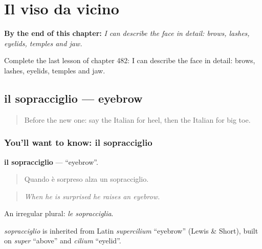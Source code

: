 
\chapter{Il viso da vicino}
\label{ch:it-il-viso-da-vicino}

\begin{chapteropening}
\textbf{By the end of this chapter:} \emph{I can describe the face in detail: brows, lashes, eyelids, temples and jaw.}

Complete the last lesson of chapter 482: I can describe the face in detail: brows, lashes, eyelids, temples and jaw.
\end{chapteropening}

\section[il sopracciglio]{il sopracciglio — eyebrow}

\label{lesson:IT-C482-sopracciglio}



\begin{quote}
Before the new one: say the Italian for heel, then the Italian for big toe.
\end{quote}

\subsection*{You'll want to know: il sopracciglio}
\textbf{il sopracciglio} — \textquotedblleft{}eyebrow\textquotedblright{}.

\begin{quote}
Quando è sorpreso alza un sopracciglio.
\end{quote}

\begin{quote}
\emph{When he is surprised he raises an eyebrow.}
\end{quote}

An irregular plural: \emph{le sopracciglia}.

\begin{cousinweb}
\emph{sopracciglio} is inherited from Latin \emph{supercilium} \textquotedblleft{}eyebrow\textquotedblright{} (Lewis \& Short), built on \emph{super} \textquotedblleft{}above\textquotedblright{} and \emph{cilium} \textquotedblleft{}eyelid\textquotedblright{}.
\end{cousinweb}

